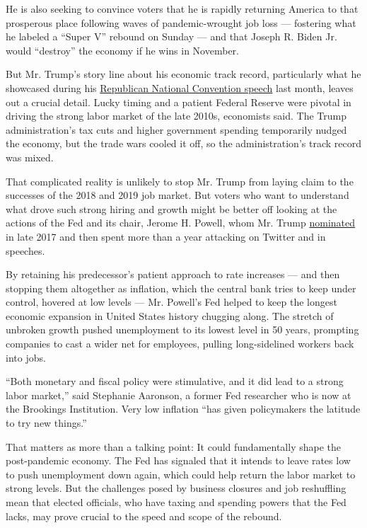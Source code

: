 He is also seeking to convince voters that he is rapidly returning
America to that prosperous place following waves of pandemic-wrought job
loss --- fostering what he labeled a ``Super V'' rebound on Sunday ---
and that Joseph R. Biden Jr. would ``destroy'' the economy if he wins in
November.

But Mr. Trump's story line about his economic track record, particularly
what he showcased during his
\href{https://www.nytimes3xbfgragh.onion/2020/08/28/us/politics/trump-rnc-speech-transcript.html}{Republican
National Convention speech} last month, leaves out a crucial detail.
Lucky timing and a patient Federal Reserve were pivotal in driving the
strong labor market of the late 2010s, economists said. The Trump
administration's tax cuts and higher government spending temporarily
nudged the economy, but the trade wars cooled it off, so the
administration's track record was mixed.

That complicated reality is unlikely to stop Mr. Trump from laying claim
to the successes of the 2018 and 2019 job market. But voters who want to
understand what drove such strong hiring and growth might be better off
looking at the actions of the Fed and its chair, Jerome H. Powell, whom
Mr. Trump
\href{https://www.nytimes3xbfgragh.onion/2017/11/02/business/economy/jerome-powell-federal-reserve-trump.html}{nominated}
in late 2017 and then spent more than a year attacking on Twitter and in
speeches.

By retaining his predecessor's patient approach to rate increases ---
and then stopping them altogether as inflation, which the central bank
tries to keep under control, hovered at low levels --- Mr. Powell's Fed
helped to keep the longest economic expansion in United States history
chugging along. The stretch of unbroken growth pushed unemployment to
its lowest level in 50 years, prompting companies to cast a wider net
for employees, pulling long-sidelined workers back into jobs.

``Both monetary and fiscal policy were stimulative, and it did lead to a
strong labor market,'' said Stephanie Aaronson, a former Fed researcher
who is now at the Brookings Institution. Very low inflation ``has given
policymakers the latitude to try new things.''

That matters as more than a talking point: It could fundamentally shape
the post-pandemic economy. The Fed has signaled that it intends to leave
rates low to push unemployment down again, which could help return the
labor market to strong levels. But the challenges posed by business
closures and job reshuffling mean that elected officials, who have
taxing and spending powers that the Fed lacks, may prove crucial to the
speed and scope of the rebound.

